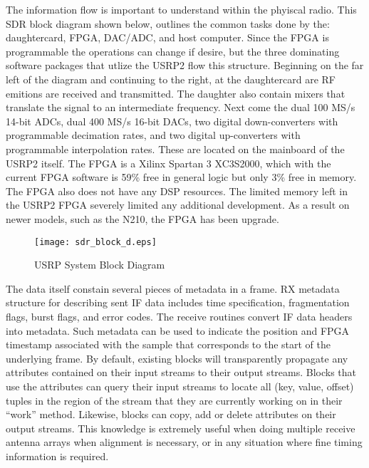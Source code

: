 The information flow is important to understand within the phyiscal radio.  This SDR block diagram shown below, outlines the common tasks done by the: daughtercard, FPGA, DAC/ADC, and host computer.  Since the FPGA is programmable the operations can change if desire, but the three dominating software packages that utlize the USRP2 flow this structure.  Beginning on the far left of the diagram and continuing to the right, at the daughtercard are RF emitions are received and transmitted.  The daughter also contain mixers that translate the signal to an intermediate frequency.  Next come the dual 100 MS/s 14-bit ADCs, dual 400 MS/s 16-bit DACs, two digital down-converters with programmable decimation rates, and two digital up-converters with programmable interpolation rates\cite{USRP2Stats}.  These are located on the mainboard of the USRP2 itself.  The FPGA is a Xilinx Spartan 3 XC3S2000, which with the current FPGA software is 59\% free in general logic but only 3\% free in memory.  The FPGA also does not have any DSP resources.  The limited memory left in the USRP2 FPGA severely limited any additional development.  As a result on newer models, such as the N210, the FPGA has been upgrade.\cite{n210spec}\\

\begin{figure}[!ht]
\centering
\texttt{[image: sdr\_block\_d.eps]}
\caption{USRP System Block Diagram\cite{sdr_blocks}}
\end{figure}

The data itself constain several pieces of metadata in a frame.  RX metadata structure for describing sent IF data includes time specification, fragmentation flags, burst flags, and error codes. The receive routines convert IF data headers into metadata\cite{metadata}.  Such metadata can be used to indicate the position and FPGA timestamp associated with the sample that corresponds to the start of the underlying frame. By default, existing blocks will transparently propagate any attributes contained on their input streams to their output streams. Blocks that use the attributes can query their input streams to locate all (key, value, offset) tuples in the region of the stream that they are currently working on in their “work” method. Likewise, blocks can copy, add or delete attributes on their output streams\cite{sdr_blog}.  This knowledge is extremely useful when doing multiple receive antenna arrays when alignment is necessary, or in any situation where fine timing information is required.\\

